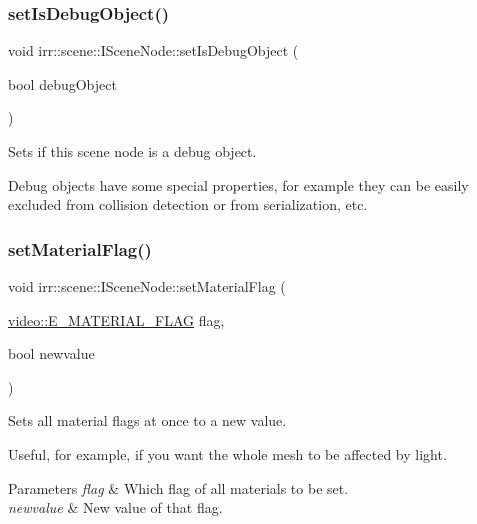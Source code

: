 \subsubsection{\texorpdfstring{set\+Is\+Debug\+Object()}{setIsDebugObject()}}
{\footnotesize\ttfamily void irr\+::scene\+::\+I\+Scene\+Node\+::set\+Is\+Debug\+Object (\begin{DoxyParamCaption}\item[{bool}]{debug\+Object }\end{DoxyParamCaption})\hspace{0.3cm}{\ttfamily [inline]}}



Sets if this scene node is a debug object. 

Debug objects have some special properties, for example they can be easily excluded from collision detection or from serialization, etc. \mbox{\label{classirr_1_1scene_1_1ISceneNode_a2841d5077854b9981711a403f33762cd}} 
\subsubsection{\texorpdfstring{set\+Material\+Flag()}{setMaterialFlag()}}
{\footnotesize\ttfamily void irr\+::scene\+::\+I\+Scene\+Node\+::set\+Material\+Flag (\begin{DoxyParamCaption}\item[{\hyperlink{namespaceirr_1_1video_a8a3bc00ae8137535b9fbc5f40add70d3}{video\+::\+E\+\_\+\+M\+A\+T\+E\+R\+I\+A\+L\+\_\+\+F\+L\+AG}}]{flag,  }\item[{bool}]{newvalue }\end{DoxyParamCaption})\hspace{0.3cm}{\ttfamily [inline]}}



Sets all material flags at once to a new value. 

Useful, for example, if you want the whole mesh to be affected by light. 
\begin{DoxyParams}{Parameters}
{\em flag} & Which flag of all materials to be set. \\
\hline
{\em newvalue} & New value of that flag. \\
\hline
\end{DoxyParams}
\mbox{\label{classirr_1_1scene_1_1ISceneNode_a0d5d2e05ebe08e6a432fbb4fd1d28dd0}} 
